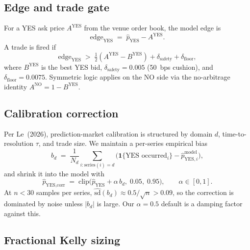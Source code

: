 \documentclass[11pt]{article}
\begin{document}
\subsection{Edge and trade gate}

For a YES ask price $A^{\text{YES}}$ from the venue order book, the model edge is
\begin{equation}
\text{edge}_{\text{YES}} \;=\; \hat p_{\text{YES}} - A^{\text{YES}}.
\end{equation}
A trade is fired if
\begin{equation}
\text{edge}_{\text{YES}} \;>\; \tfrac{1}{2}(A^{\text{YES}} - B^{\text{YES}}) + \delta_{\text{safety}} + \delta_{\text{floor}},
\end{equation}
where $B^{\text{YES}}$ is the best YES bid, $\delta_{\text{safety}} = 0.005$ (50~bps cushion), and $\delta_{\text{floor}} = 0.0075$. Symmetric logic applies on the NO side via the no-arbitrage identity $A^{\text{NO}} = 1 - B^{\text{YES}}$.

\subsection{Calibration correction}

Per Le~(2026), prediction-market calibration is structured by domain $d$, time-to-resolution $\tau$, and trade size. We maintain a per-series empirical bias
\begin{equation}
b_d \;=\; \frac{1}{N_d}\sum_{i: \text{series}(i) = d}
\Big(\mathbf{1}\{\text{YES occurred}_i\} - \hat p_{\text{YES},i}^{\text{model}}\Big),
\end{equation}
and shrink it into the model with
\begin{equation}
\hat p_{\text{YES,corr}} \;=\; \mathrm{clip}\!\Big(\hat p_{\text{YES}} + \alpha\,b_d,\; 0.05,\; 0.95\Big),\qquad
\alpha \in [0,1].
\label{eq:cal}
\end{equation}
At $n < 30$ samples per series, $\widehat{\mathrm{sd}}(b_d) \approx 0.5/\sqrt{n} > 0.09$, so the correction is dominated by noise unless $|b_d|$ is large. Our $\alpha = 0.5$ default is a damping factor against this.

\subsection{Fractional Kelly sizing}
\end{document}
